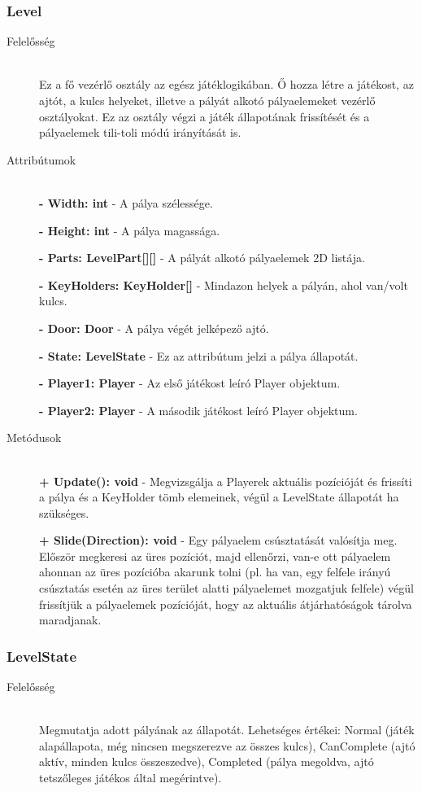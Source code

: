\subsubsection{Level}
	\begin{description}
		\item[Felelősség] \hfill \\
		Ez a fő vezérlő osztály az egész játéklogikában. Ő hozza létre a játékost, az ajtót, a kulcs helyeket, illetve a pályát alkotó pályaelemeket vezérlő osztályokat. Ez az osztály végzi a játék állapotának frissítését és a pályaelemek tili-toli módú irányítását is.
		
		\item[Attribútumok]\hfill \\
		\textbf{- Width: int} - A pálya szélessége.
		
		\textbf{- Height: int} - A pálya magassága.
		
		\textbf{- Parts: LevelPart[][]} - A pályát alkotó pályaelemek 2D listája.
		
		\textbf{- KeyHolders: KeyHolder[]} - Mindazon helyek a pályán, ahol van/volt kulcs.
		
		\textbf{- Door: Door} - A pálya végét jelképező ajtó.
		
		\textbf{- State: LevelState} - Ez az attribútum jelzi a pálya állapotát.
		
		\textbf{- Player1: Player} - Az első játékost leíró Player objektum.

		\textbf{- Player2: Player} - A második játékost leíró Player objektum.
		
		\item[Metódusok]\hfill \\
		\textbf{+ Update(): void} - Megvizsgálja a Playerek aktuális pozícióját és frissíti a pálya és a KeyHolder tömb elemeinek, végül a LevelState állapotát ha szükséges.
		
		\textbf{+ Slide(Direction): void} - Egy pályaelem csúsztatását valósítja meg. Először megkeresi az üres pozíciót, majd ellenőrzi, van-e ott pályaelem ahonnan az üres pozícióba akarunk tolni (pl. ha van, egy felfele irányú csúsztatás esetén az üres terület alatti pályaelemet mozgatjuk felfele) végül frissítjük a pályaelemek pozícióját, hogy az aktuális átjárhatóságok tárolva maradjanak.
						
	\end{description}
	
\subsubsection{LevelState}
	\begin{description}
		\item[Felelősség] \hfill \\
		Megmutatja adott pályának az állapotát. Lehetséges értékei: Normal (játék alapállapota, még nincsen megszerezve az összes kulcs), CanComplete (ajtó aktív, minden kulcs összeszedve), Completed (pálya megoldva, ajtó tetszőleges játékos által megérintve).

	\end{description}

